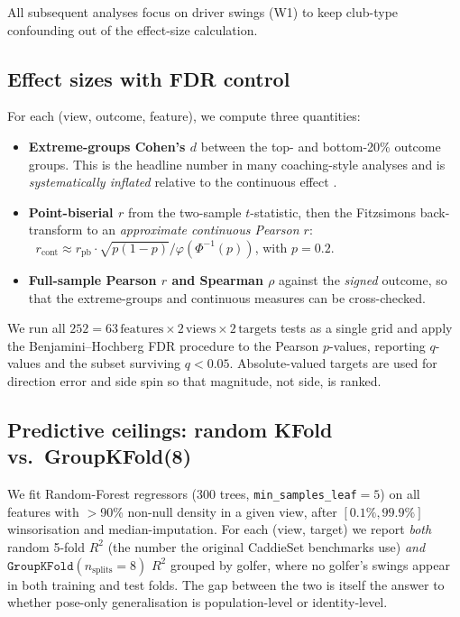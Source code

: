 \documentclass[11pt,a4paper]{article}
\begin{document}
All subsequent analyses focus on driver swings (W1) to keep club-type confounding out of the effect-size
calculation.

\subsection{Effect sizes with FDR control}
For each (view, outcome, feature), we compute three quantities:
\begin{itemize}
    \item \textbf{Extreme-groups Cohen's $d$} between the top- and bottom-20\% outcome groups.  This is the
          headline number in many coaching-style analyses and is \emph{systematically inflated} relative to the
          continuous effect \citep{cohen1983dichotomization}.
    \item \textbf{Point-biserial $r$} from the two-sample $t$-statistic, then the Fitzsimons back-transform
          \citep{fitzsimons2008correction} to an \emph{approximate continuous Pearson $r$}:
          $\;\;r_{\text{cont}} \approx r_{\text{pb}} \cdot \sqrt{p(1-p)} / \varphi(\Phi^{-1}(p))$,
          with $p=0.2$.
    \item \textbf{Full-sample Pearson $r$ and Spearman $\rho$} against the \emph{signed} outcome, so that the
          extreme-groups and continuous measures can be cross-checked.
\end{itemize}
We run all $252 = 63\,\text{features} \times 2\,\text{views} \times 2\,\text{targets}$ tests as a single grid
and apply the Benjamini--Hochberg FDR procedure \citep{benjamini1995controlling} to the Pearson $p$-values,
reporting $q$-values and the subset surviving $q<0.05$.  Absolute-valued targets are used for direction error
and side spin so that magnitude, not side, is ranked.

\subsection{Predictive ceilings: random KFold vs.\ GroupKFold(8)}
We fit Random-Forest regressors \citep{breiman2001randomforest} (300 trees, \texttt{min\_samples\_leaf}$=5$) on
all features with $>$90\% non-null density in a given view, after $[0.1\%,99.9\%]$ winsorisation and
median-imputation.  For each (view, target) we report \emph{both} random 5-fold $R^2$ (the number the original
CaddieSet benchmarks use) \emph{and} $\texttt{GroupKFold}(n_\text{splits}=8)$ $R^2$ grouped by golfer, where
no golfer's swings appear in both training and test folds.  The gap between the two is itself the answer to
whether pose-only generalisation is population-level or identity-level.
\end{document}
